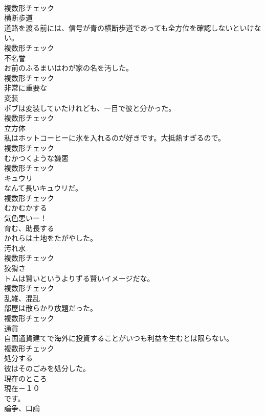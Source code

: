 \documentclass[8pt]{extreport}
\begin{document}
\begin{CJK}{UTF8}{min}
\\	複数形チェック
\\	[名詞]	横断歩道	
\\	道路を渡る前には、信号が青の横断歩道であっても全方位を確認しないといけない。	
\\	複数形チェック
\\	[名詞]	不名誉	
\\	お前のふるまいはわが家の名を汚した。	
\\	複数形チェック
\\	[形容詞]	非常に重要な	
\\	[名詞]	変装	
\\	ボブは変装していたけれども、一目で彼と分かった。	
\\	複数形チェック
\\	[名詞]	立方体	
\\	私はホットコーヒーに氷を入れるのが好きです。大抵熱すぎるので。	
\\	複数形チェック
\\	[名詞]	むかつくような嫌悪	
\\	複数形チェック
\\	[名詞]	キュウリ	
\\	なんて長いキュウリだ。	
\\	複数形チェック
\\	[形容詞]	むかむかする	
\\	気色悪いー！	
\\	[動詞]	育む、助⻑する	
\\	かれらは土地をたがやした。	
\\	[名詞]	汚れ水	
\\	複数形チェック
\\	[名詞]	狡猾さ	
\\	トムは賢いというよりずる賢いイメージだな。	
\\	複数形チェック
\\	[名詞]	乱雑、混乱	
\\	部屋は散らかり放題だった。	
\\	複数形チェック
\\	[名詞]	通貨	
\\	自国通貨建てで海外に投資することがいつも利益を生むとは限らない。	
\\	複数形チェック
\\	[動詞]	処分する	
\\	彼はそのごみを処分した。	
\\	[形容詞]	現在のところ	
\\	現在－１０
\\	です。	
\\	[名詞]	論争、口論	

\end{CJK}
\end{document}
